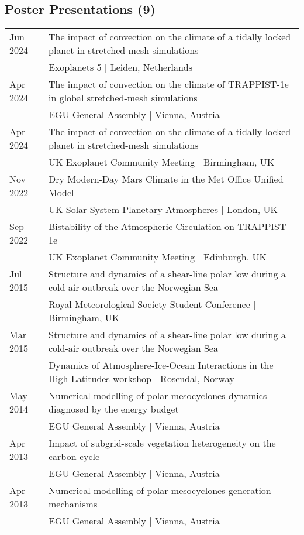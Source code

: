 \documentclass[a4paper, 11pt]{article}
\begin{document}
\vspace{1ex}
\subsection*{Poster Presentations (9)}
\begin{tabularx}{\linewidth}{@{}l X@{}}
Jun 2024 & The impact of convection on the climate of a tidally locked planet in stretched-mesh simulations \\ & Exoplanets 5 | Leiden, Netherlands \\
Apr 2024 & The impact of convection on the climate of TRAPPIST-1e in global stretched-mesh simulations \\ & EGU General Assembly | Vienna, Austria \\
Apr 2024 & The impact of convection on the climate of a tidally locked planet in stretched-mesh simulations \\ & UK Exoplanet Community Meeting | Birmingham, UK \\
Nov 2022 & Dry Modern-Day Mars Climate in the Met Office Unified Model \\ & UK Solar System Planetary Atmospheres | London, UK \\
Sep 2022 & Bistability of the Atmospheric Circulation on TRAPPIST-1e \\ & UK Exoplanet Community Meeting | Edinburgh, UK \\
Jul 2015 & Structure and dynamics of a shear-line polar low during a cold-air outbreak over the Norwegian Sea \\ & Royal Meteorological Society Student Conference | Birmingham, UK \\
Mar 2015 & Structure and dynamics of a shear-line polar low during a cold-air outbreak over the Norwegian Sea \\ & Dynamics of Atmosphere-Ice-Ocean Interactions in the High Latitudes workshop | Rosendal, Norway \\
May 2014 & Numerical modelling of polar mesocyclones dynamics diagnosed by the energy budget \\ & EGU General Assembly | Vienna, Austria \\
Apr 2013 & Impact of subgrid-scale vegetation heterogeneity on the carbon cycle \\ & EGU General Assembly | Vienna, Austria \\
Apr 2013 & Numerical modelling of polar mesocyclones generation mechanisms \\ & EGU General Assembly | Vienna, Austria \\
\end{tabularx}
\end{document}
